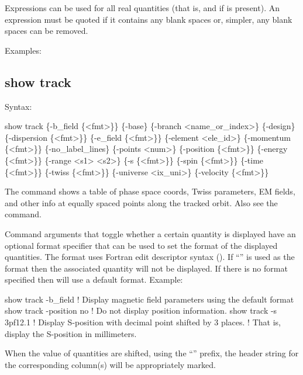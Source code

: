 {{{{{{{{{{Expressions can be used for all real quantities (that is,  and  if  is
present). An expression must be quoted if it contains any blank spaces or, simpler, any blank spaces
can be removed.

Examples:

\vfill\break


\subsection{show track}
\label{s:show.track}

Syntax:
\begin{example}
  show track \{-b_field \{<fmt>\}\} \{-base\} \{-branch <name_or_index>\} \{-design\} 
      \{-dispersion \{<fmt>\}\} \{-e_field \{<fmt>\}\} \{-element <ele_id>\} \{-momentum \{<fmt>\}\} 
      \{-no_label_lines\} \{-points <num>\} \{-position \{<fmt>\}\} \{-energy \{<fmt>\}\} 
      \{-range <s1> <s2>\} \{-s \{<fmt>\}\} \{-spin \{<fmt>\}\} \{-time \{<fmt>\}\} 
      \{-twiss \{<fmt>\}\} \{-universe <ix_uni>\} \{-velocity \{<fmt>\}\}
\end{example}

The  command shows a table of phase space coords, Twiss parameters, EM fields, and
other info at equally spaced points along the tracked orbit. Also see the 
command.

Command arguments that toggle whether a certain quantity is displayed have an optional 
format specifier that can be used to set the format of the displayed quantities. The format uses
Fortran edit descriptor syntax (). If ``'' is used as the format then
the associated quantity will not be displayed. If there is no format specified then \tao will use
a default format. Example:
\begin{example}
  show track -b_field      ! Display magnetic field parameters using the default format
  show track -position no  ! Do not display position information.
  show track -s 3pf12.1    ! Display S-position with decimal point shifted by 3 places.
                           !   That is, display the S-position in millimeters.
\end{example}
When the value of quantities are shifted, using the ``'' prefix, the header string for the
corresponding column(s) will be appropriately marked.

}}}}}}}}}}
